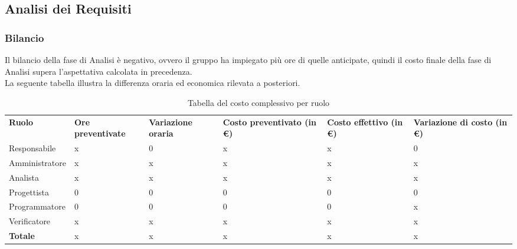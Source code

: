 \subsection{Analisi dei Requisiti}
\subsubsection{Bilancio}
Il bilancio della fase di Analisi è negativo, ovvero il gruppo ha impiegato più ore di quelle anticipate, quindi il costo finale della fase di Analisi supera l'aspettativa calcolata in precedenza.\\
La seguente tabella illustra la differenza oraria ed economica rilevata a posteriori.

{
\renewcommand{\arraystretch}{2}
\begin{longtable}[h]{ C{2.5cm} C{2.5cm} C{2.5cm} C{2.5cm} C{1.5cm} C{2.5cm}}
\caption{Tabella del costo complessivo per ruolo}\\
\rowcolor{\primaryColor}

\textcolor{\secondaryColor}{\textbf{Ruolo}} & 
\textcolor{\secondaryColor}{\textbf{Ore preventivate}} & 
\textcolor{\secondaryColor}{\textbf{Variazione oraria}} & 
\textcolor{\secondaryColor}{\textbf{Costo preventivato (in \euro{})}} & 
\textcolor{\secondaryColor}{\textbf{Costo effettivo (in \euro{})}} & 
\textcolor{\secondaryColor}{\textbf{Variazione di costo (in \euro{})}}\\	
	
Responsabile    &  x &   0 & x & x &    0 \\
Amministratore  &  x & x & x & x & x \\
Analista        & x & x & x & x & x \\
Progettista     &   0 &   0 &    0 &    0 &    0 \\
Programmatore   &   0 &   0 &    0 &    0 & x \\
Verificatore    &  x &  x & x & x & x \\
\textbf{Totale} & x & x & x & x & x \\	

\end{longtable}
}

